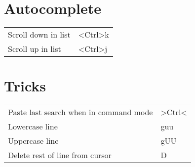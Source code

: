 \documentclass[a4paper]{report}
\def \tablewidth {9cm}
\begin{document}
\section{Autocomplete}
\begin{tabularx}{\tablewidth}{| X | l |}
  \hline
  Scroll down in list & \textless Ctrl\textgreater k \\
  Scroll up in list & \textless Ctrl\textgreater j \\
  \hline
\end{tabularx}

\section{Tricks}
\begin{tabularx}{\tablewidth}{| X | l |}
  \hline
  Paste last search when in command mode & \textgreater Ctrl\textless \\
  Lowercase line & guu \\
  Uppercase line & gUU \\
  Delete rest of line from cursor & D \\
  \hline
\end{tabularx}
\end{document}
